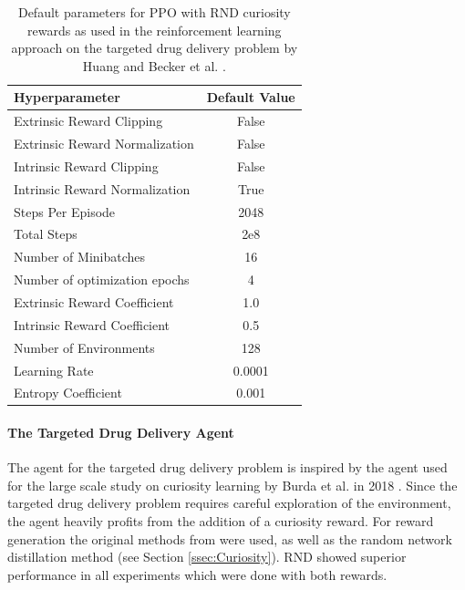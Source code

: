 \begin{table} [ht]
    \begin{center}
        \begin{tabular}{|p{6.5cm}|c|}
            \hline
            Hyperparameter & Default Value \\
            \hline
            Extrinsic Reward Clipping & False \\
            Extrinsic Reward Normalization & False \\
            Intrinsic Reward Clipping & False \\
            Intrinsic Reward Normalization & True \\
            Steps Per Episode & 2048 \\
            Total Steps & 2e8 \\
            Number of Minibatches & 16 \\
            Number of optimization epochs & 4 \\
            Extrinsic Reward Coefficient & 1.0 \\
            Intrinsic Reward Coefficient & 0.5 \\
            Number of Environments & 128 \\
            Learning Rate & 0.0001 \\
            Entropy Coefficient & 0.001 \\
            \hline
        \end{tabular}
    \end{center}
    \caption[RL Approach Default Parameters]{Default parameters for PPO with RND curiosity rewards as used in the reinforcement learning approach on the targeted drug delivery problem by Huang and Becker et al. \cite{huang2019}.} \label{tab:RLDefaults}
\end{table}

\paragraph{The Targeted Drug Delivery Agent}
The agent for the targeted drug delivery problem is inspired by the agent used for the large scale study on curiosity learning by Burda et al. in 2018 \cite{burda2018large}. Since the targeted drug delivery problem requires careful exploration of the environment, the agent heavily profits from the addition of a curiosity reward. For reward generation the original methods from \cite{burda2018large} were used, as well as the random network distillation method (see Section \ref{ssec:Curiosity}). RND showed superior performance in all experiments which were done with both rewards. 

